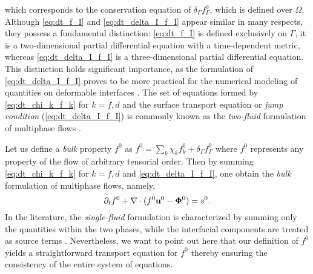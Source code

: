 which corresponds to the conservation equation of $\delta_\Gamma f_\Gamma^0$, which is defined over $\Omega$.
Although \ref{eq:dt_f_I} and \ref{eq:dt_delta_I_f_I} appear similar in many respects, they possess a fundamental distinction: \ref{eq:dt_f_I} is defined exclusively on $\Gamma$, it is a two-dimensional partial differential equation with a time-dependent metric, whereas \ref{eq:dt_delta_I_f_I} is a three-dimensional partial differential equation. 
This distinction holds significant importance, as the formulation of \ref{eq:dt_delta_I_f_I} proves to be more practical for the numerical modeling of quantities on deformable interfaces \citep{teigen2009}. %
The set of equations formed by \ref{eq:dt_chi_k_f_k} for $k = f,d$ and the surface transport equation or \textit{jump condition} (\ref{eq:dt_delta_I_f_I}) is commonly known as the \textit{two-fluid} formulation of multiphase flows \citep{morel2015mathematical,tryggvason2011direct,drew1983mathematical,kataoka1986local}. 

Let us define a \textit{bulk} property $f^0$ as $f^0 = \sum_{k} \chi_k f_k^0 + \delta_\Gamma  f_\Gamma^0$ where $f^0$ represents any property of the flow of arbitrary tensorial order.
Then by summing \ref{eq:dt_chi_k_f_k} for $k=f,d$ and \ref{eq:dt_delta_I_f_I}, one obtain the \textit{bulk} formulation of multiphase flows, namely,%
\begin{equation}
   \partial_t f^0
   + \mathbf{\nabla}\cdot (
       f^0 \textbf{u}^0
       -  \mathbf{\Phi}^0 
    )
   = s^0. 
   \label{eq:dt_f}
\end{equation}
In the literature, the \textit{single-fluid} formulation is characterized by summing only the quantities within the two phases, while the interfacial components are treated as source terms \citep{morel2015mathematical,tryggvason2011direct,drew1983mathematical}.
Nevertheless, we want to point out here that our definition of $f^0$ yields a straightforward transport equation for $f^0$ thereby ensuring the consistency of the entire system of equations.



